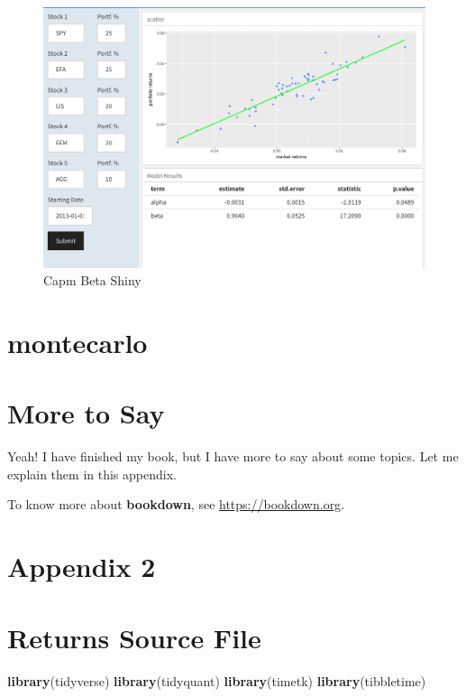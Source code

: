 \documentclass[]{krantz}
\makeatletter
\newenvironment{Shaded}{\begin{snugshade}}{\end{snugshade}}
\newcommand{\KeywordTok}[1]{\textcolor[rgb]{0.13,0.29,0.53}{\textbf{#1}}}
\newcommand{\NormalTok}[1]{#1}
\newenvironment{kframe}{%
\medskip{}
\setlength{\fboxsep}{.8em}
 \def\at@end@of@kframe{}%
 \ifinner\ifhmode%
  \def\at@end@of@kframe{\end{minipage}}%
  \begin{minipage}{\columnwidth}%
 \fi\fi%
 \def\FrameCommand##1{\hskip\@totalleftmargin \hskip-\fboxsep
 \colorbox{shadecolor}{##1}\hskip-\fboxsep
     \hskip-\linewidth \hskip-\@totalleftmargin \hskip\columnwidth}%
 \MakeFramed {\advance\hsize-\width
   \@totalleftmargin\z@ \linewidth\hsize
   \@setminipage}}%
 {\par\unskip\endMakeFramed%
 \at@end@of@kframe}
\renewenvironment{Shaded}{\begin{kframe}}{\end{kframe}}
\makeatother
\begin{document}
\begin{figure}
\includegraphics[width=1\linewidth]{snapshots/capm-beta-shiny.png} \caption{Capm Beta Shiny}\label{fig:unnamed-chunk-42}
\end{figure}

\chapter{montecarlo}\label{montecarlo}

\cleardoublepage 

\appendix {}


\chapter{More to Say}\label{more-to-say}

Yeah! I have finished my book, but I have more to say about some topics.
Let me explain them in this appendix.

To know more about \textbf{bookdown}, see \url{https://bookdown.org}.

\chapter*{Appendix 2}\label{appendix-2}


\chapter{Returns Source File}\label{returns-source-file}

\begin{Shaded}
\begin{Highlighting}[]
\KeywordTok{library}\NormalTok{(tidyverse)}
\KeywordTok{library}\NormalTok{(tidyquant)}
\KeywordTok{library}\NormalTok{(timetk)}
\KeywordTok{library}\NormalTok{(tibbletime)}
\end{Highlighting}
\end{Shaded}
\end{document}
